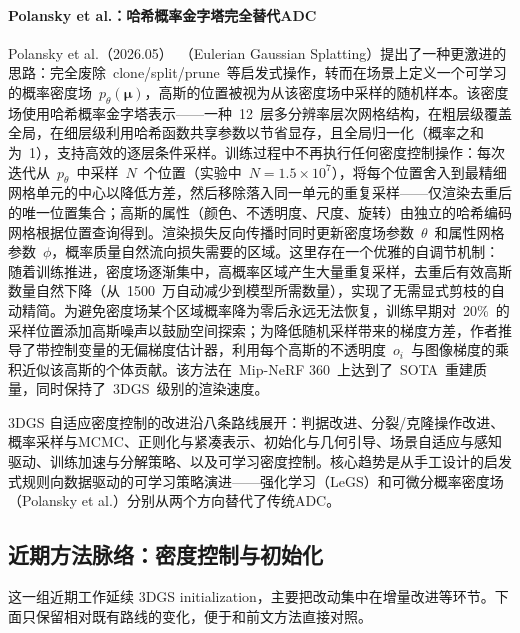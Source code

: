 \paragraph{Polansky et al.：哈希概率金字塔完全替代ADC}
Polansky et al.（2026.05）~\cite{2605_29136}（Eulerian Gaussian Splatting）提出了一种更激进的思路：完全废除~clone/split/prune~等启发式操作，转而在场景上定义一个可学习的概率密度场~$p_\theta(\boldsymbol{\mu})$，高斯的位置被视为从该密度场中采样的随机样本。该密度场使用哈希概率金字塔表示——一种~12~层多分辨率层次网格结构，在粗层级覆盖全局，在细层级利用哈希函数共享参数以节省显存，且全局归一化（概率之和为~1），支持高效的逐层条件采样。训练过程中不再执行任何密度控制操作：每次迭代从~$p_\theta$~中采样~$N$~个位置（实验中~$N = 1.5 \times 10^7$），将每个位置舍入到最精细网格单元的中心以降低方差，然后移除落入同一单元的重复采样——仅渲染去重后的唯一位置集合；高斯的属性（颜色、不透明度、尺度、旋转）由独立的哈希编码网格根据位置查询得到。渲染损失反向传播时同时更新密度场参数~$\theta$~和属性网格参数~$\phi$，概率质量自然流向损失需要的区域。这里存在一个优雅的自调节机制：随着训练推进，密度场逐渐集中，高概率区域产生大量重复采样，去重后有效高斯数量自然下降（从~1500~万自动减少到模型所需数量），实现了无需显式剪枝的自动精简。为避免密度场某个区域概率降为零后永远无法恢复，训练早期对~20\%~的采样位置添加高斯噪声以鼓励空间探索；为降低随机采样带来的梯度方差，作者推导了带控制变量的无偏梯度估计器，利用每个高斯的不透明度~$o_i$~与图像梯度的乘积近似该高斯的个体贡献。该方法在~Mip-NeRF 360~上达到了~SOTA~重建质量，同时保持了~3DGS~级别的渲染速度。

\begin{takeaway}
3DGS 自适应密度控制的改进沿八条路线展开：判据改进、分裂/克隆操作改进、概率采样与MCMC、正则化与紧凑表示、初始化与几何引导、场景自适应与感知驱动、训练加速与分解策略、以及可学习密度控制。核心趋势是从手工设计的启发式规则向数据驱动的可学习策略演进——强化学习（LeGS）和可微分概率密度场（Polansky et al.）分别从两个方向替代了传统ADC。
\end{takeaway}



\subsection{近期方法脉络：密度控制与初始化}

这一组近期工作延续 3DGS initialization，主要把改动集中在增量改进等环节。下面只保留相对既有路线的变化，便于和前文方法直接对照。

